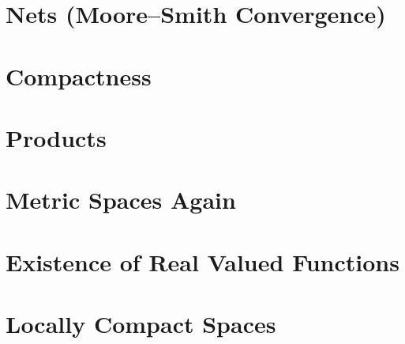 \section{Nets (Moore--Smith Convergence)}





\section{Compactness}




\section{Products}
\addtocounter{subsection}{1}

\addtocounter{subsection}{-2}

\addtocounter{subsection}{1}








\section{Metric Spaces Again}






\section{Existence of Real Valued Functions}



\section{Locally Compact Spaces}




